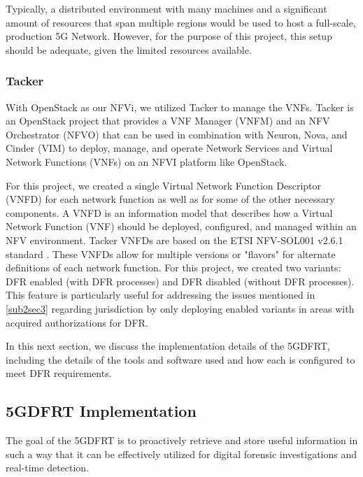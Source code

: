 \documentclass[final,1p,times,authoryear]{elsarticle}
\begin{document}
Typically, a distributed environment with many machines and a significant amount of resources that span multiple regions would be used to host a full-scale, production 5G Network. However, for the purpose of this project, this setup should be adequate, given the limited resources available.

\subsubsection{Tacker}
\label{sub3sub1sec2}
With OpenStack as our NFVi, we utilized Tacker to manage the VNFs. Tacker is an OpenStack project that provides a VNF Manager (VNFM) and an NFV Orchestrator (NFVO) that can be used in combination with Neuron, Nova, and Cinder (VIM) to deploy, manage, and operate Network Services and Virtual Network Functions (VNFs) on an NFVI platform like OpenStack.

\vspace{1em}

For this project, we created a single Virtual Network Function Descriptor (VNFD) for each network function as well as for some of the other necessary components. A VNFD is an information model that describes how a Virtual Network Function (VNF) should be deployed, configured, and managed within an NFV environment. Tacker VNFDs are based on the ETSI NFV-SOL001 v2.6.1 standard \citep{etsi2023}. These VNFDs allow for multiple versions or "flavors" for alternate definitions of each network function. For this project, we created two variants: DFR enabled (with DFR processes) and DFR disabled (without DFR processes). This feature is particularly useful for addressing the issues mentioned in \ref{sub2sec3} regarding jurisdiction by only deploying enabled variants in areas with acquired authorizations for DFR.

\vspace{1em}

In this next section, we discuss the implementation details of the 5GDFRT, including the details of the tools and software used and how each is configured to meet DFR requirements.

\subsection{5GDFRT Implementation}
\label{sub3sec2}
The goal of the 5GDFRT is to proactively retrieve and store useful information in such a way that it can be effectively utilized for digital forensic investigations and real-time detection.
\end{document}
